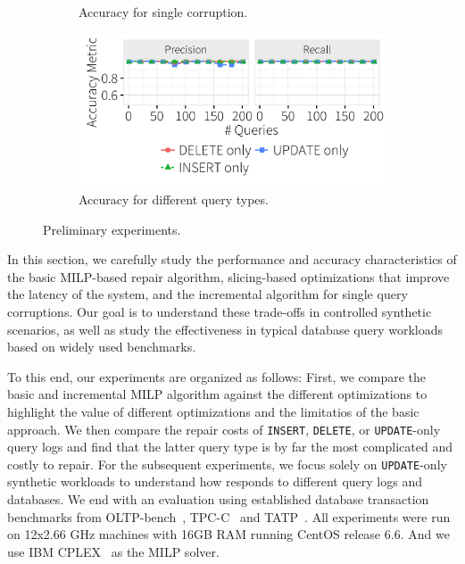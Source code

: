 \begin{figure}[h]
\begin{subfigure}[t]{.33\textwidth}
    \vspace*{-.25in}
    \caption{Accuracy for single corruption.}
    \label{f:singlequeryinc_acc} 
    \end{subfigure}
    \begin{subfigure}[t]{.33\textwidth}
    \includegraphics[width = .99\columnwidth]{figures/indelup_pr}
    \vspace*{-.25in}
    \caption{Accuracy for different query types.}
    \label{f:indelup_acc} 
    \end{subfigure}
    \caption{Preliminary experiments.}
  \end{figure}


In this section, we carefully study the performance and accuracy
characteristics of the basic MILP-based repair algorithm, 
slicing-based optimizations that improve the latency of the system, 
and the incremental algorithm for single query corruptions. 
Our goal is to understand these trade-offs in
controlled synthetic scenarios, as well as study the effectiveness
in typical database query workloads based on widely used benchmarks.


To this end, our experiments are organized as follows: First, 
we compare the basic and incremental MILP algorithm against the different optimizations 
to highlight the value of different optimizations and the limitatios of the basic approach.  
We then compare the repair costs of \texttt{INSERT}, \texttt{DELETE}, or \texttt{UPDATE}-only query logs 
and find that the latter query type is by far the most complicated and costly to repair.
For the subsequent experiments, we focus solely on \texttt{UPDATE}-only synthetic workloads 
to understand how \sys responds to different query logs and databases.  
We end with an evaluation using established database transaction benchmarks from OLTP-bench~\cite{difallah2013oltp},
TPC-C~\cite{tpcc} and TATP~\cite{tatp}. 
All experiments were run on 12x2.66 GHz  machines with 16GB RAM running CentOS release 6.6. And we use IBM CPLEX~\cite{cplex2014v12} 
as the MILP solver.



